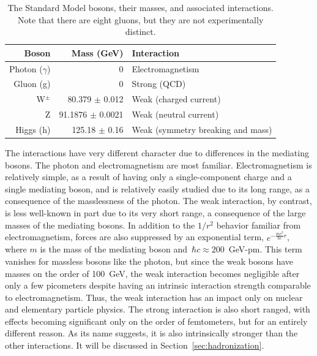   \begin{table}
    \centering
    \begin{tabular}{r r l}
      Boson             & Mass (GeV) \cite{pdg} & Interaction \\
      \hline
      Photon ($\gamma$) & 0                     & Electromagnetism \\
      Gluon (g)         & 0                     & Strong (QCD) \\
      W$^{\pm}$         & 80.379 $\pm$ 0.012    & Weak (charged current) \\
      Z                 & 91.1876 $\pm$ 0.0021  & Weak (neutral current) \\
      Higgs (h)         & 125.18 $\pm$ 0.16     & Weak (symmetry breaking and mass) \\
    \end{tabular}
    \caption[Table of Standard Model bosons.]
            {The Standard Model bosons, their masses, and associated interactions. Note that there are eight gluons, but they are not experimentally distinct.}
            \label{tab:bosons}
  \end{table}

  The interactions have very different character due to differences in the mediating bosons.
  The photon and electromagnetism are most familiar.
  Electromagnetism is relatively simple, as a result of having only a single-component charge and a single mediating boson, and is relatively easily studied due to its long range, as a consequence of the masslessness of the photon.
  The weak interaction, by contrast, is less well-known in part due to its very short range, a consequence of the large masses of the mediating bosons.
  In addition to the $1/r^2$ behavior familiar from electromagnetism, forces are also suppressed by an exponential term, $e^{-\frac{mc^2}{\hbar c}r}$, where $m$ is the mass of the mediating boson and $\,\hbar c \approx 200$~GeV-pm.
  This term vanishes for massless bosons like the photon, but since the weak bosons have masses on the order of 100~GeV, the weak interaction becomes negligible after only a few picometers despite having an intrinsic interaction strength comparable to electromagnetism.
  Thus, the weak interaction has an impact only on nuclear and elementary particle physics.
  The strong interaction is also short ranged, with effects becoming significant only on the order of femtometers, but for an entirely different reason.
  As its name suggests, it is also intrinsically stronger than the other interactions.
  It will be discussed in Section~\ref{sec:hadronization}.

